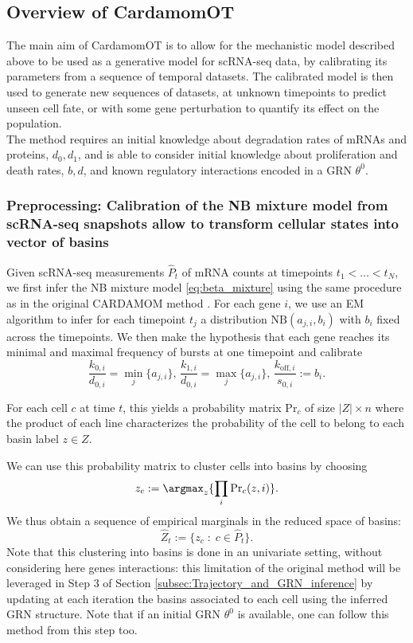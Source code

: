 \subsection{Overview of CardamomOT}
The main aim of CardamomOT is to allow for the mechanistic model described above to be used as a generative model for scRNA-seq data, by calibrating its parameters from a sequence of temporal datasets. The calibrated model is then used to generate new sequences of datasets, at unknown timepoints to predict unseen cell fate, or with some gene perturbation to quantify its effect on the population.\\

The method requires an initial knowledge about degradation rates of mRNAs and proteins, $d_0, d_1$, and is able to consider initial knowledge about proliferation and death rates, $b, d$, and known regulatory interactions encoded in a GRN $\theta^0$. 


\subsubsection{Preprocessing: Calibration of the NB mixture model from scRNA-seq snapshots allow to transform cellular states into vector of basins}
\label{subsec:Mixture_inference}

Given scRNA-seq measurements $\widehat P_t$ of mRNA counts at timepoints
$t_1<\dots<t_N$, we first infer the NB mixture model
\eqref{eq:beta_mixture} using the same procedure as in the original
CARDAMOM method \cite{ventre2023one}. For each gene $i$, we use an EM algorithm to infer for each timepoint $t_j$ a distribution $\textrm{NB}(a_{j,i}, b_i)$ with $b_i$ fixed across the timepoints. We then make the hypothesis that each gene reaches its minimal and maximal frequency of bursts at one timepoint and calibrate $$\frac{k_{0,i}}{d_{0, i}} = \min_j \{a_{j,i}\},\,\frac{k_{1,i}}{d_{0, i}} = \max_j \{a_{j,i}\},\,\frac{k_{\mathrm{off},i}}{s_{0, i}} := b_i.$$

For each cell $c$ at time $t$, this yields a probability matrix ${\mathrm{Pr}}_c$ of size $|Z| \times n$ where the product of each line characterizes the probability of the cell to belong to each basin label $z \in Z$.

We can use this probability matrix to cluster cells into basins by choosing 
\begin{equation}
z_c := \argmax_z \{\prod_i {\mathrm{Pr}}_c(z, i)\}.
\label{basins_argmax}
\end{equation}
We thus obtain a sequence of empirical marginals in the reduced space of basins:
\[
\widehat Z_t := \{ z_c \;:\; c\in \widehat P_t \}.
\]
Note that this clustering into basins is done in an univariate setting, without considering here genes interactions: this limitation of the original method will be leveraged in Step 3 of Section \ref{subsec:Trajectory_and_GRN_inference} by updating at each iteration the basins associated to each cell using the inferred GRN structure. Note that if an initial GRN $\theta^0$ is available, one can follow this method from this step too.

